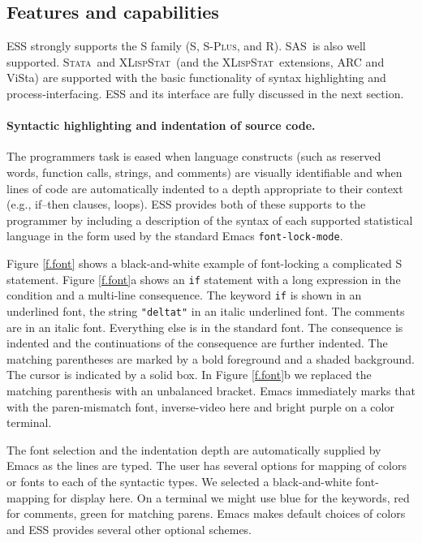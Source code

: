 \documentclass{article}
\newcommand*{\SAS}{\textsc{SAS}}
\newcommand*{\Splus}{\textsc{S-Plus}}
\newcommand*{\XLispStat}{\textsc{XLispStat}}
\newcommand*{\Stata}{\textsc{Stata}}
\newcommand{\stexttt}[1]{{\small\texttt{#1}}}
\begin{document}
\subsection{Features and capabilities}
\label{sec:ESS:features}

ESS strongly supports the S family (S, \Splus, and R).
\SAS\ is also well supported.  \Stata\
and \XLispStat\ (and the \XLispStat\ extensions, ARC and ViSta) are
supported with the basic functionality of syntax highlighting and
process-interfacing.  ESS and its interface are fully discussed in the
next section.

\paragraph{Syntactic highlighting and indentation of source code.}
The programmers task is eased when language constructs (such as
reserved words, function calls, strings, and comments) are visually
identifiable and when lines of code are automatically indented to a
depth appropriate to their context (e.g., if--then clauses, loops).
ESS provides both of these supports to the programmer by
including a description of the syntax of each
supported statistical language in the form used by the standard Emacs
\stexttt{font-lock-mode}.  

Figure \ref{f.font} shows a black-and-white example of font-locking a
complicated S statement.  Figure \ref{f.font}a shows an \stexttt{if}
statement with a long expression in the condition and a multi-line
consequence.  The keyword \stexttt{if} is shown in an underlined font,
the string \stexttt{"deltat"} in an italic underlined font.  The
comments are in an italic font.  Everything else is in the standard
font.  The consequence is indented and the continuations of the
consequence are further indented.  The matching parentheses are marked
by a bold foreground and a shaded background.  The cursor is indicated
by a solid box.  In Figure \ref{f.font}b we replaced the matching
parenthesis with an unbalanced bracket.  Emacs immediately marks that
with the paren-mismatch font, inverse-video here and bright purple on
a color terminal.

The font selection and the indentation depth are automatically
supplied by Emacs as the lines are typed.  The user has several
options for mapping of colors or fonts to each of the syntactic types.
We selected a black-and-white font-mapping for display here.  On a
terminal we might use blue for the keywords, red for comments, green
for matching parens.  Emacs makes default choices of colors and ESS
provides several other optional schemes.
\end{document}
